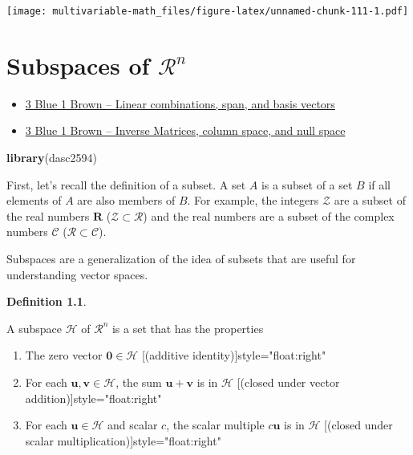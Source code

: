 \documentclass[
]{book}
\newenvironment{Shaded}{\begin{snugshade}}{\end{snugshade}}
\newcommand{\KeywordTok}[1]{\textcolor[rgb]{0.13,0.29,0.53}{\textbf{#1}}}
\newcommand{\NormalTok}[1]{#1}
\theoremstyle{definition}
\newtheorem{definition}{Definition}[chapter]
\theoremstyle{definition}
\theoremstyle{definition}
\theoremstyle{definition}
\theoremstyle{remark}
\begin{document}
\texttt{[image: multivariable-math\_files/figure-latex/unnamed-chunk-111-1.pdf]}

\hypertarget{subspaces-Rn}{%
\chapter{\texorpdfstring{Subspaces of \(\mathcal{R}^n\)}{Subspaces of \textbackslash mathcal\{R\}\^{}n}}\label{subspaces-Rn}}

\begin{itemize}
\item
  \href{https://www.3blue1brown.com/lessons/span}{3 Blue 1 Brown -- Linear combinations, span, and basis vectors}
\item
  \href{https://www.3blue1brown.com/lessons/inverse-matrices}{3 Blue 1 Brown -- Inverse Matrices, column space, and null space}
\end{itemize}

\begin{Shaded}
\begin{Highlighting}[]
\KeywordTok{library}\NormalTok{(dasc2594)}
\end{Highlighting}
\end{Shaded}

First, let's recall the definition of a subset. A set \(A\) is a subset of a set \(B\) if all elements of \(A\) are also members of \(B\). For example, the integers \(\mathcal{Z}\) are a subset of the real numbers \(\mathbf{R}\) (\(\mathcal{Z} \subset \mathcal{R}\)) and the real numbers are a subset of the complex numbers \(\mathcal{C}\) (\(\mathcal{R} \subset \mathcal{C}\)).

Subspaces are a generalization of the idea of subsets that are useful for understanding vector spaces.

\begin{definition}
\protect\hypertarget{def:subspace}{}\label{def:subspace}

A subspace \(\mathcal{H}\) of \(\mathcal{R}^n\) is a set that has the properties

\begin{enumerate}
\def\labelenumi{\arabic{enumi})}
\item
  The zero vector \(\mathbf{0} \in \mathcal{H}\) \hfill \hfill [(additive identity)]{style="float:right"}
\item
  For each \(\mathbf{u}, \mathbf{v} \in \mathcal{H}\), the sum \(\mathbf{u} + \mathbf{v}\) is in \(\mathcal{H}\) \hfill [(closed under vector addition)]{style="float:right"}
\item
  For each \(\mathbf{u} \in \mathcal{H}\) and scalar \(c\), the scalar multiple \(c \mathbf{u}\) is in \(\mathcal{H}\) \hfill [(closed under scalar multiplication)]{style="float:right"}
\end{enumerate}

\end{definition}
\end{document}
